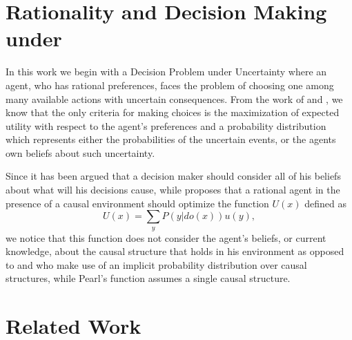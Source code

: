 \documentclass[letterpaper]{article}
\begin{document}
\section{Rationality and Decision Making under}
In this work we begin with a Decision Problem under Uncertainty where an agent, who has rational preferences, faces the problem of choosing one among many available actions with uncertain consequences. From the work of \cite{von1944theory} and \cite{savage1954the}, we know that the only criteria for making choices is the maximization of expected utility with respect to the agent's preferences and a probability distribution which represents either the probabilities of the uncertain events, or the agents own beliefs about such uncertainty. 

Since \cite{joyce1999foundations} it has been argued that a decision maker should consider all of his beliefs about what will his decisions cause, while \cite{pearl2009causality} proposes that a rational agent in the presence of a causal environment should optimize the function $U(x)$ defined as 
\[ U(x)=\sum_y P(y | do(x)) u(y), \]
we notice that this function does not consider the agent's beliefs, or current knowledge, about the causal structure that holds in his environment as opposed to \cite{gonzalez2018playing} and \cite{2019arXiv190202279G} who make use of an implicit probability distribution over causal structures, while Pearl's function assumes a single causal structure. 

\section{Related Work}
\end{document}
